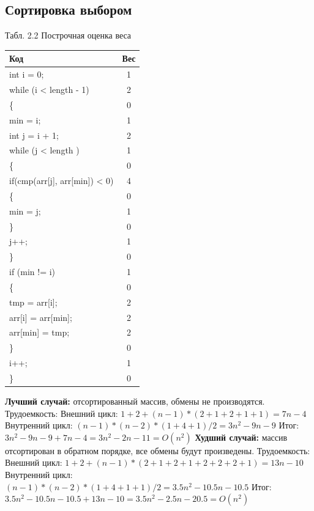 \documentclass{report}
\begin{document}
\subsection{Сортировка выбором}
\begin{center}
Табл. 2.2 Построчная оценка веса
	\begin{tabular}{|l c|} 
 	\hline
	Код & Вес \\ [0.5ex] 
 	\hline
	int i = 0; & 1\\
 	\hline
	while (i < length - 1) & 2\\
	\hline
	\{ & 0\\
	\hline
	min = i; & 1\\
	\hline
	int j = i + 1; & 2\\
 	\hline
	while (j < length ) & 1\\
	\hline
	\{ & 0\\	
	\hline
	if(cmp(arr[j], arr[min]) < 0) & 4\\
	\hline
	\{ & 0\\
    \hline
    min = j; & 1\\
    \hline
    \} & 0\\
	\hline
	j++; & 1\\
	\hline
	\} & 0\\
	\hline
	if (min != i) & 1\\
	\hline
	\{ & 0\\
	\hline
	tmp = arr[i]; & 2\\
	\hline
    arr[i] = arr[min]; & 2\\
    \hline
    arr[min] = tmp; & 2\\
    \hline
	\} & 0\\
	\hline
	i++; & 1\\
	\hline
	\} & 0\\
	\hline
	\end{tabular}
\end{center}
\hspace*{5mm}
\textbf{Лучший случай:} отсортированный массив, обмены не производятся.
\newline
Трудоемкость: 
\newline
Внешний цикл: $1 + 2 + (n - 1) * (2 + 1 + 2 + 1 + 1) = 7n - 4$
\newline
Внутренний цикл: $(n - 1) * (n - 2) * (1 + 4 + 1) / 2 = 3n^2 -9n -9$
\newline
Итог: $3n^2 -9n -9 + 7n - 4 = 3n^2 -2n - 11 = O(n^2)$
\newline
\hspace*{5mm}
\textbf{Худший случай:} массив отсортирован в обратном порядке, все обмены будут произведены. \newline
Трудоемкость: 
\newline
Внешний цикл: $1 + 2 + (n - 1) * (2 + 1 + 2 + 1 + 2 + 2 + 2 + 1) = 13n - 10$
\newline
Внутренний цикл: $(n - 1) * (n - 2) * (1 + 4 + 1 + 1) / 2 = 3.5n^2 -10.5n -10.5$
\newline
Итог: $3.5n^2 -10.5n -10.5 + 13n - 10 = 3.5n^2 -2.5n - 20.5 = O(n^2)$
\end{document}
